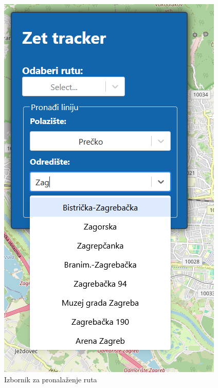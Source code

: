 \documentclass[zavrsnirad]{fer}
\begin{document}
\begin{figure}[H]
\begin{minipage}[c]{0.3\textwidth}
		\includegraphics[width=\textwidth]{Figures/pretrazivanje.png}
		\caption{Izbornik za pronalaženje ruta}
		\label{slk:pretrazivanje}
	\end{minipage}
	\hfill
	\begin{minipage}[c]{0.3\textwidth}
		\centering

\end{minipage}
\end{figure}
\end{document}
